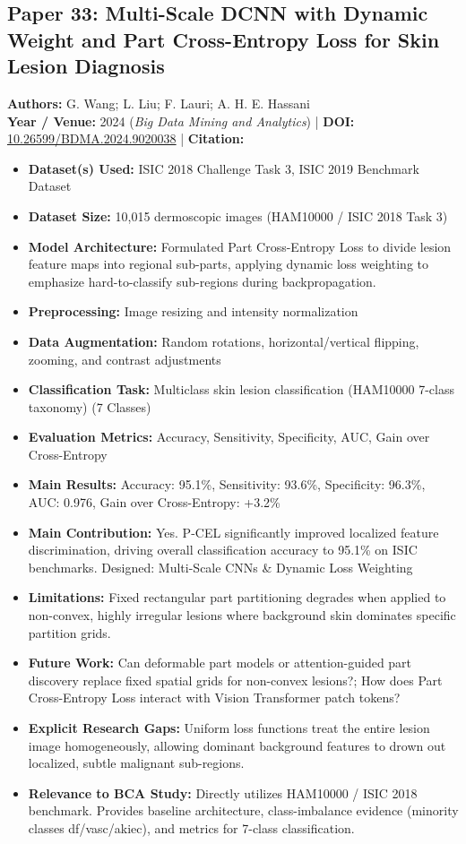 \documentclass[11pt,a4paper]{article}
\begin{document}
\subsection{Paper 33: Multi-Scale DCNN with Dynamic Weight and Part Cross-Entropy Loss for Skin Lesion Diagnosis}
\textbf{Authors:} G. Wang; L. Liu; F. Lauri; A. H. E. Hassani \\
\textbf{Year / Venue:} 2024 (\textit{Big Data Mining and Analytics}) | \textbf{DOI:} \href{https://doi.org/10.26599/BDMA.2024.9020038}{10.26599/BDMA.2024.9020038} | \textbf{Citation:} \cite{10778156}

\begin{itemize}\small
\item \textbf{Dataset(s) Used:} ISIC 2018 Challenge Task 3, ISIC 2019 Benchmark Dataset
\item \textbf{Dataset Size:} 10,015 dermoscopic images (HAM10000 / ISIC 2018 Task 3)
\item \textbf{Model Architecture:} Formulated Part Cross-Entropy Loss to divide lesion feature maps into regional sub-parts, applying dynamic loss weighting to emphasize hard-to-classify sub-regions during backpropagation.
\item \textbf{Preprocessing:} Image resizing and intensity normalization
\item \textbf{Data Augmentation:} Random rotations, horizontal/vertical flipping, zooming, and contrast adjustments
\item \textbf{Classification Task:} Multiclass skin lesion classification (HAM10000 7-class taxonomy) (7 Classes)
\item \textbf{Evaluation Metrics:} Accuracy, Sensitivity, Specificity, AUC, Gain over Cross-Entropy
\item \textbf{Main Results:} Accuracy: 95.1\%, Sensitivity: 93.6\%, Specificity: 96.3\%, AUC: 0.976, Gain over Cross-Entropy: +3.2\%
\item \textbf{Main Contribution:} Yes. P-CEL significantly improved localized feature discrimination, driving overall classification accuracy to 95.1\% on ISIC benchmarks. Designed: Multi-Scale CNNs \& Dynamic Loss Weighting
\item \textbf{Limitations:} Fixed rectangular part partitioning degrades when applied to non-convex, highly irregular lesions where background skin dominates specific partition grids.
\item \textbf{Future Work:} Can deformable part models or attention-guided part discovery replace fixed spatial grids for non-convex lesions?; How does Part Cross-Entropy Loss interact with Vision Transformer patch tokens?
\item \textbf{Explicit Research Gaps:} Uniform loss functions treat the entire lesion image homogeneously, allowing dominant background features to drown out localized, subtle malignant sub-regions.
\item \textbf{Relevance to BCA Study:} Directly utilizes HAM10000 / ISIC 2018 benchmark. Provides baseline architecture, class-imbalance evidence (minority classes df/vasc/akiec), and metrics for 7-class classification.
\end{itemize}
\end{document}
